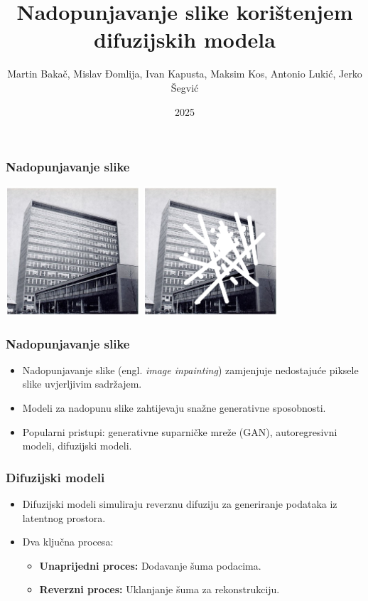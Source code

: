 \documentclass{beamer}
\title{Nadopunjavanje slike korištenjem difuzijskih modela}
\author{Martin Bakač, Mislav Đomlija, Ivan Kapusta, Maksim Kos, Antonio Lukić, Jerko Šegvić}
\institute{Sveučilište u Zagrebu, Fakultet elektrotehnike i računarstva}
\date{2025}
\begin{document}
\frame{\titlepage}

\begin{frame}
    \frametitle{Nadopunjavanje slike}
    \includegraphics[width=5cm]{images/fer1.jpg}
    \includegraphics[width=5cm]{images/fer2.png}
\end{frame}

\begin{frame}
    \frametitle{Nadopunjavanje slike}
    \begin{itemize}
        \item Nadopunjavanje slike (engl. \emph{image inpainting}) zamjenjuje nedostajuće piksele slike uvjerljivim sadržajem.
        \pause
        \item Modeli za nadopunu slike zahtijevaju snažne generativne sposobnosti.
        \pause
        \item Popularni pristupi: generativne suparničke mreže (GAN), autoregresivni modeli, difuzijski modeli.
    \end{itemize}
\end{frame}

\begin{frame}
    \frametitle{Difuzijski modeli}
    \begin{itemize}
        \item Difuzijski modeli simuliraju reverznu difuziju za generiranje podataka iz latentnog prostora.
        \pause
        \item Dva ključna procesa:
        \begin{itemize}
            \item \textbf{Unaprijedni proces:} Dodavanje šuma podacima.
            \item \textbf{Reverzni proces:} Uklanjanje šuma za rekonstrukciju.
        \end{itemize}
    \end{itemize}
\end{frame}
\end{document}
